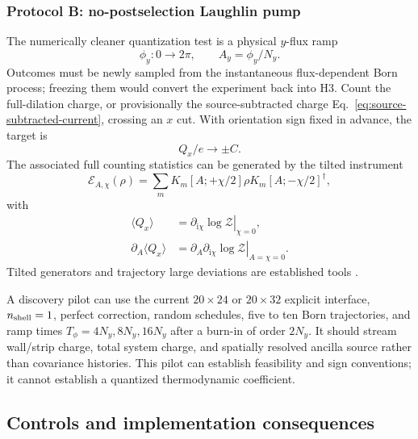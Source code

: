 \documentclass[aps,prb,onecolumn,nofootinbib,superscriptaddress]{revtex4-2}
\newcommand{\ii}{\mathrm{i}}
\newcommand{\cE}{\mathcal{E}}
\begin{document}
\subsubsection{Protocol B: no-postselection Laughlin pump}

The numerically cleaner quantization test is a physical $y$-flux ramp
\begin{equation}
  \phi_y:0\longrightarrow2\pi,
  \qquad A_y=\phi_y/N_y.
\end{equation}
Outcomes must be newly sampled from the instantaneous flux-dependent Born
process; freezing them would convert the experiment back into H3.  Count the
full-dilation charge, or provisionally the source-subtracted charge
Eq.~\eqref{eq:source-subtracted-current}, crossing an $x$ cut.  With orientation
sign fixed in advance, the target is
\begin{equation}
  Q_x/e\longrightarrow\pm C.
  \label{eq:laughlin-pump-target}
\end{equation}
The associated full counting statistics can be generated by the tilted
instrument
\begin{equation}
  \cE_{A,\chi}(\rho)
  =\sum_m K_m[A;+\chi/2]\rho K_m[A;-\chi/2]^\dagger,
  \label{eq:tilted-instrument}
\end{equation}
with
\begin{align}
  \langle Q_x\rangle
  &=\left.\partial_{\ii\chi}\log\mathcal Z\right|_{\chi=0},\nonumber\\
  \partial_A\langle Q_x\rangle
  &=\left.\partial_A\partial_{\ii\chi}
    \log\mathcal Z\right|_{A=\chi=0}.
  \label{eq:fcs-derivatives}
\end{align}
Tilted generators and trajectory large deviations are established tools
\cite{GarrahanLesanovsky2010,FlindtNovotnyBraggioSassettiJauho2008}.

A discovery pilot can use the current $20\times24$ or $20\times32$ explicit
interface, $n_{\rm shell}=1$, perfect correction, random schedules, five to ten
Born trajectories, and ramp times $T_\phi=4N_y,8N_y,16N_y$ after a burn-in of
order $2N_y$.  It should stream wall/strip charge, total system charge, and
spatially resolved ancilla source rather than covariance histories.  This
pilot can establish feasibility and sign conventions; it cannot establish a
quantized thermodynamic coefficient.

\subsection{Controls and implementation consequences}
\end{document}
